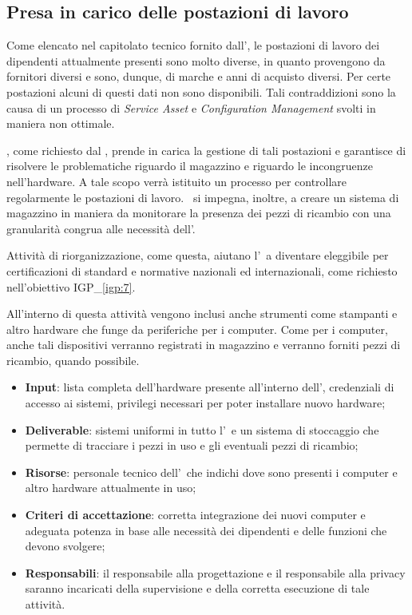 	\subsection{Presa in carico delle postazioni di lavoro}
	
		Come elencato nel capitolato tecnico fornito dall'\istituto, le postazioni di lavoro dei dipendenti attualmente presenti sono molto diverse, in quanto provengono da fornitori diversi e sono, dunque, di marche e anni di acquisto diversi.
		Per certe postazioni alcuni di questi dati non sono disponibili.
		Tali contraddizioni sono la causa di un processo di \textit{Service Asset} e \textit{Configuration Management} svolti in maniera non ottimale.
		
		\azienda, come richiesto dal \proponente, prende in carica la gestione di tali postazioni e garantisce di risolvere le problematiche riguardo il magazzino e riguardo le incongruenze nell'hardware.
		A tale scopo verrà istituito un processo per controllare regolarmente le postazioni di lavoro.
		\azienda~si impegna, inoltre, a creare un sistema di magazzino in maniera da monitorare la presenza dei pezzi di ricambio con una granularità congrua alle necessità dell'\istituto.
		
		Attività di riorganizzazione, come questa, aiutano l'\istituto~a diventare eleggibile per certificazioni di standard e normative nazionali ed internazionali, come richiesto nell'obiettivo {\color{pantone}IGP\_\ref{igp:7}}.
		
		All'interno di questa attività vengono inclusi anche strumenti come stampanti e altro hardware che funge da periferiche per i computer.
		Come per i computer, anche tali dispositivi verranno registrati in magazzino e verranno forniti pezzi di ricambio, quando possibile.
		
		\begin{itemize}[noitemsep]
			\renewcommand\labelitemi{--}
			\item \textbf{Input}: lista completa dell'hardware presente all'interno dell'\istituto, credenziali di accesso ai sistemi, privilegi necessari per poter installare nuovo hardware;
			\item \textbf{Deliverable}: sistemi uniformi in tutto l'\istituto~e un sistema di stoccaggio che permette di tracciare i pezzi in uso e gli eventuali pezzi di ricambio;
			\item \textbf{Risorse}: personale tecnico dell'\istituto~che indichi dove sono presenti i computer e altro hardware attualmente in uso;
			\item \textbf{Criteri di accettazione}: corretta integrazione dei nuovi computer e adeguata potenza in base alle necessità dei dipendenti e delle funzioni che devono svolgere;
			\item \textbf{Responsabili}: il responsabile alla progettazione e il responsabile alla privacy saranno incaricati della supervisione e della corretta esecuzione di tale attività.
		\end{itemize}
		
